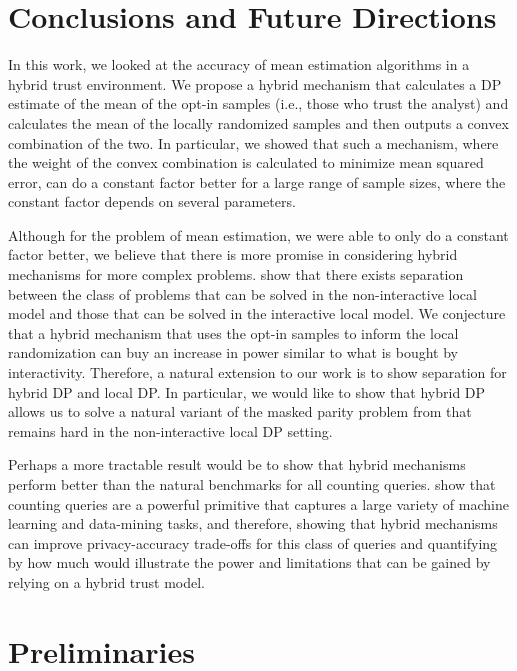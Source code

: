 \documentclass{article}
\theoremstyle{plain}
\begin{document}
\section{Conclusions and Future Directions}
In this work, we looked at the accuracy of mean estimation algorithms in a hybrid trust environment. We propose a hybrid mechanism that calculates a DP estimate of the mean of the opt-in samples (i.e., those who trust the analyst) and calculates the mean of the locally randomized samples and then outputs a convex combination of the two. In particular, we showed that such a mechanism, where the weight of the convex combination is calculated to minimize mean squared error, can do a constant factor better for a large range of sample sizes, where the constant factor depends on several parameters.

Although for the problem of mean estimation, we were able to only do a constant factor better, we believe that there is more promise in considering hybrid mechanisms for more complex problems. \cite{Kasiviswanathan:2011:WLP:2078965.2078976} show that there exists separation between the class of problems that can be solved in the non-interactive local model and those that can be solved in the interactive local model. We conjecture that a hybrid mechanism that uses the opt-in samples to inform the local randomization can buy an increase in power similar to what is bought by interactivity. Therefore, a natural extension to our work is to show separation for hybrid DP and local DP. In particular, we would like to show that hybrid DP allows us to solve a natural variant of the masked parity problem from \cite{Kasiviswanathan:2011:WLP:2078965.2078976} that remains hard in the non-interactive local DP setting.

Perhaps a more tractable result would be to show that hybrid mechanisms perform better than the natural benchmarks for all counting queries. \cite{Blum:2005:PPS:1065167.1065184} show that counting queries are a powerful primitive that captures a large variety of machine learning and data-mining tasks, and therefore, showing that hybrid mechanisms can improve privacy-accuracy trade-offs for this class of queries and quantifying by how much would illustrate the power and limitations that can be gained by relying on a hybrid trust model. 



\small



\appendix
\section{Preliminaries}\label{sec:preliminaries}

\end{document}
